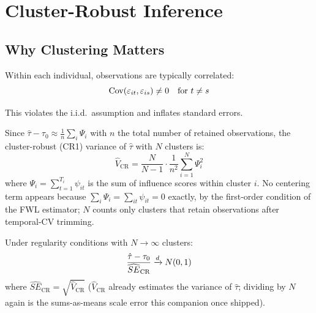 
\section{Cluster-Robust Inference}\label{sec:cluster_robust}

\subsection{Why Clustering Matters}

Within each individual, observations are typically correlated:
\[
\mathrm{Cov}(\varepsilon_{it}, \varepsilon_{is}) \neq 0 \quad \text{for } t \neq s
\]

This violates the i.i.d.\ assumption and inflates standard errors.

\begin{definition}
\label{def:cluster_variance}
Since $\hat{\tau} - \tau_0 \approx \frac{1}{n}\sum_i \Psi_i$ with $n$ the
total number of retained observations, the cluster-robust (CR1) variance of
$\hat{\tau}$ with $N$ clusters is:
\begin{equation}
\hat{V}_{\text{CR}} = \frac{N}{N-1} \cdot \frac{1}{n^2} \sum_{i=1}^{N} \Psi_i^2
\end{equation}
where $\Psi_i = \sum_{t=1}^{T_i} \psi_{it}$ is the sum of influence scores
within cluster $i$. No centering term appears because
$\sum_i \Psi_i = \sum_{it} \psi_{it} = 0$ exactly, by the first-order
condition of the FWL estimator; $N$ counts only clusters that retain
observations after temporal-CV trimming.
\end{definition}

\begin{theorem}
\label{thm:cluster_robust}
Under regularity conditions with $N \to \infty$ clusters:
\[
\frac{\hat{\tau} - \tau_0}{\widehat{SE}_{\text{CR}}} \xrightarrow{d} N(0, 1)
\]
where $\widehat{SE}_{\text{CR}} = \sqrt{\hat{V}_{\text{CR}}}$ ($\hat{V}_{\text{CR}}$ already estimates the variance of $\hat{\tau}$; dividing by $N$ again is the sums-as-means scale error this companion once shipped).
\end{theorem}

